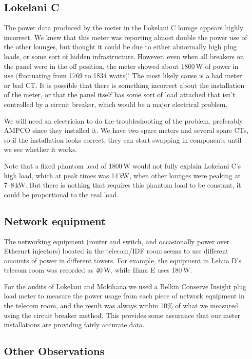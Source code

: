 \documentclass[11pt,draft]{article}
\newcommand{\W}{\,W\xspace}
\newcommand{\kW}{\,kW\xspace}
\begin{document}
\subsection{Lokelani C}
\label{sec:lokelani-c}
The power data produced by the meter in the Lokelani C lounge appears highly incorrect. We knew that this meter was reporting almost double the power use of the other lounges, but thought it could be due to either abnormally high plug loads, or some sort of hidden infrastructure. However, even when all breakers on the panel were in the off position, the meter showed about 1800\W of power in use (fluctuating from 1769 to 1834 watts)! The most likely cause is a bad meter or bad CT\@. It is possible that there is something incorrect about the installation of the meter, or that the panel itself has some sort of load attached that isn't controlled by a circuit breaker, which would be a major electrical problem.

We will need an electrician to do the troubleshooting of the problem, preferably AMPCO since they installed it. We have two spare meters and several spare CTs, so if the installation looks correct, they can start swapping in components until we see whether it works.

Note that a fixed phantom load of 1800\W would not fully explain Lokelani C's high load, which at peak times was 14\kW, when other lounges were peaking at 7--8\kW. But there is nothing that requires this phantom load to be constant, it could be proportional to the real load.

\subsection{Network equipment}

The networking equipment (router and switch, and occasionally power over Ethernet injectors) located in the telecom/IDF room seems to use different amounts of power in different towers. For example, the equipment in Lehua D's telecom room was recorded as 40\W, while Ilima E uses 180\W.

For the audits of Lokelani and Mokihana we used a Belkin Conserve Insight plug load meter to measure the power usage from each piece of network equipment in the telecom room, and the result was always within 10\% of what we measured using the circuit breaker method. This provides some assurance that our meter installations are providing fairly accurate data.

\subsection{Other Observations}
\end{document}
